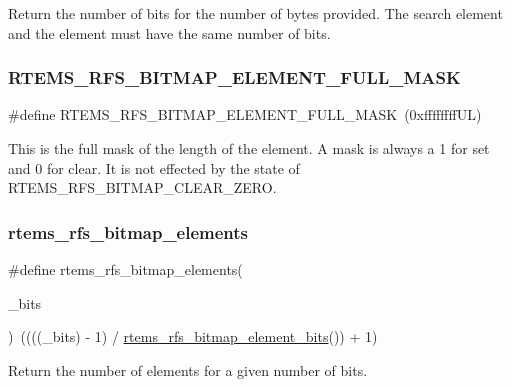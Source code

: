 Return the number of bits for the number of bytes provided. The search element and the element must have the same number of bits. \mbox{\label{rtems-rfs-bitmaps_8h_a4bf35eb00bf85c48828951345f140106}} 
\subsubsection{\texorpdfstring{RTEMS\_RFS\_BITMAP\_ELEMENT\_FULL\_MASK}{RTEMS\_RFS\_BITMAP\_ELEMENT\_FULL\_MASK}}
{\footnotesize\ttfamily \#define R\+T\+E\+M\+S\+\_\+\+R\+F\+S\+\_\+\+B\+I\+T\+M\+A\+P\+\_\+\+E\+L\+E\+M\+E\+N\+T\+\_\+\+F\+U\+L\+L\+\_\+\+M\+A\+SK~(0xffffffff\+U\+L)}

This is the full mask of the length of the element. A mask is always a 1 for set and 0 for clear. It is not effected by the state of R\+T\+E\+M\+S\+\_\+\+R\+F\+S\+\_\+\+B\+I\+T\+M\+A\+P\+\_\+\+C\+L\+E\+A\+R\+\_\+\+Z\+E\+RO. \mbox{\label{rtems-rfs-bitmaps_8h_aa6013059cd24b7dbfca056121f4c51b3}} 
\subsubsection{\texorpdfstring{rtems\_rfs\_bitmap\_elements}{rtems\_rfs\_bitmap\_elements}}
{\footnotesize\ttfamily \#define rtems\+\_\+rfs\+\_\+bitmap\+\_\+elements(\begin{DoxyParamCaption}\item[{}]{\+\_\+bits }\end{DoxyParamCaption})~((((\+\_\+bits) -\/ 1) / \mbox{\hyperlink{rtems-rfs-bitmaps_8h_a1a65e04003510b29a2fcb55e43940449}{rtems\+\_\+rfs\+\_\+bitmap\+\_\+element\+\_\+bits}}()) + 1)}

Return the number of elements for a given number of bits. \mbox{\label{rtems-rfs-bitmaps_8h_af0872737babfc79ed19f089f387471cb}} 
